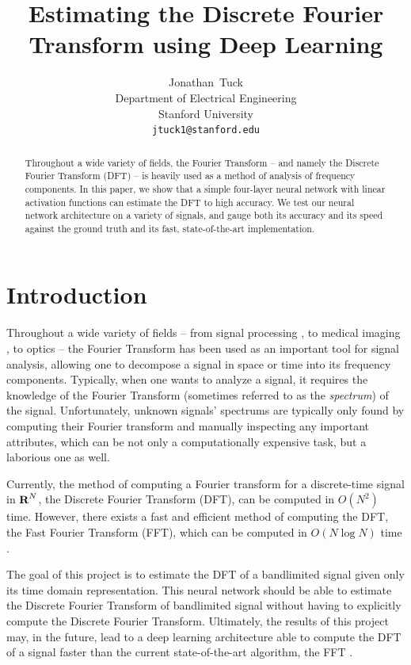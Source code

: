 \documentclass[12pt]{article}
\title{
Estimating the Discrete Fourier Transform using Deep Learning
}
\author{
  Jonathan~Tuck\\
  Department of Electrical Engineering\\
  Stanford University\\
  \texttt{jtuck1@stanford.edu} \\
}
\begin{document}
\maketitle

\begin{abstract}
Throughout a wide variety of fields, the Fourier Transform -- and namely the Discrete Fourier Transform (DFT) -- 
is heavily used as a method of analysis of frequency components. In this paper, we show that a simple four-layer 
neural network with linear activation functions can estimate the DFT to high accuracy. We test our neural network 
architecture on a variety of signals, and gauge both its accuracy and its speed against the ground truth and its 
fast, state-of-the-art implementation.
\end{abstract}

\newpage

\section{Introduction}
Throughout a wide variety of fields -- from signal processing \cite{OS:99}, to medical imaging \cite{S:00}, 
to optics \cite{G:96} -- the Fourier Transform has been used as an important tool for signal analysis, allowing 
one to decompose a signal in space or time into its frequency components. Typically, when one wants to analyze a 
signal, it requires the knowledge of the Fourier Transform (sometimes referred to as the \emph{spectrum}) of the 
signal. Unfortunately, unknown signals' spectrums are typically only found by computing their Fourier transform 
and manually inspecting any important attributes, which can be not only a computationally expensive task, but a 
laborious one as well. 

Currently, the method of computing a Fourier transform for a discrete-time signal in ${\mbox{\bf R}}^N$, the Discrete 
Fourier Transform (DFT), can be computed in $O(N^2)$ time. However, there exists a fast and efficient 
method of computing the DFT, the Fast Fourier Transform (FFT), which can be computed 
in $O(N \log N)$ time \cite{B:78,O:17}.

The goal of this project is to estimate the DFT of a bandlimited signal given only 
its time domain representation. This neural network should be able to estimate the Discrete Fourier 
Transform of bandlimited signal without having to explicitly compute the Discrete Fourier Transform. 
Ultimately, the results of this project may, in the future, lead to a deep learning architecture able to 
compute the DFT of a signal faster than the current state-of-the-art algorithm, the FFT \cite{CT:65}.
\end{document}
